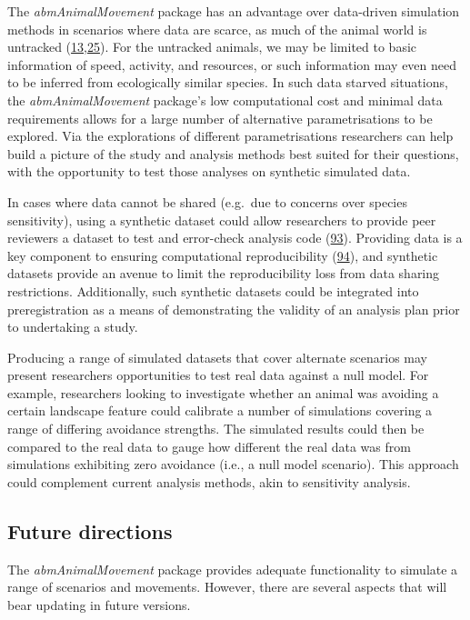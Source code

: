 \documentclass[10pt,a4paper]{article}
\begin{document}
The \emph{abmAnimalMovement} package has an advantage over data-driven simulation methods in scenarios where data are scarce, as much of the animal world is untracked (\protect\hyperlink{ref-joo_recent_2022}{13},\protect\hyperlink{ref-crane_lots_2021}{25}).
For the untracked animals, we may be limited to basic information of speed, activity, and resources, or such information may even need to be inferred from ecologically similar species.
In such data starved situations, the \emph{abmAnimalMovement} package's low computational cost and minimal data requirements allows for a large number of alternative parametrisations to be explored.
Via the explorations of different parametrisations researchers can help build a picture of the study and analysis methods best suited for their questions, with the opportunity to test those analyses on synthetic simulated data.

In cases where data cannot be shared (e.g.~due to concerns over species sensitivity), using a synthetic dataset could allow researchers to provide peer reviewers a dataset to test and error-check analysis code (\protect\hyperlink{ref-Quintana2020}{93}).
Providing data is a key component to ensuring computational reproducibility (\protect\hyperlink{ref-Gerstner2017}{94}), and synthetic datasets provide an avenue to limit the reproducibility loss from data sharing restrictions.
Additionally, such synthetic datasets could be integrated into preregistration as a means of demonstrating the validity of an analysis plan prior to undertaking a study.

Producing a range of simulated datasets that cover alternate scenarios may present researchers opportunities to test real data against a null model.
For example, researchers looking to investigate whether an animal was avoiding a certain landscape feature could calibrate a number of simulations covering a range of differing avoidance strengths.
The simulated results could then be compared to the real data to gauge how different the real data was from simulations exhibiting zero avoidance (i.e., a null model scenario).
This approach could complement current analysis methods, akin to sensitivity analysis.

\hypertarget{future-directions}{%
\subsection{Future directions}\label{future-directions}}

The \emph{abmAnimalMovement} package provides adequate functionality to simulate a range of scenarios and movements.
However, there are several aspects that will bear updating in future versions.
\end{document}
